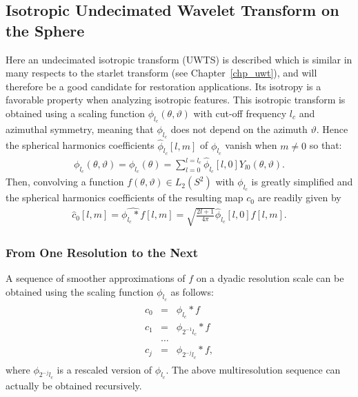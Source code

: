 \subsection{Isotropic Undecimated Wavelet Transform on the Sphere}
Here an undecimated isotropic transform (UWTS) is described which is similar in many respects to the starlet transform (see Chapter~\ref{chp_uwt}), and will therefore be a good candidate for restoration applications.
Its isotropy is a favorable property when analyzing isotropic features. 
This isotropic transform is obtained using a scaling function ${\phi}_{l_c}(\theta, \vartheta)$ 
with cut-off frequency  $l_c$ and  azimuthal symmetry, meaning that ${\phi}_{l_c}$ does not depend 
on the azimuth $\vartheta$. Hence the spherical harmonics coefficients $\hat {\phi}_{l_c} [l,m]$ of ${\phi}_{l_c}$ vanish 
when $m \ne 0$ so that:
\begin{eqnarray}
{\phi}_{l_c}(\theta, \vartheta)= {\phi}_{l_c}(\theta) = \sum_{l = 0}^{l = l_c} \hat  {\phi}_{l_c} [l,0] Y_{l0}(\theta, \vartheta) .
\end{eqnarray}
Then, convolving a function $f(\theta, \vartheta) \in L_2(S^2)$ with ${\phi}_{l_c}$ is greatly simplified 
and the spherical harmonics coefficients of the resulting map $c_0$ are readily given by
\begin{eqnarray}
 \hat c_{0}[l,m] = \widehat{{\phi}_{l_c} * f} [l,m] = \sqrt{\frac{2l+1}{4\pi} } \hat {\phi}_{l_c} [l,0] \hat f[l,m]  .
\end{eqnarray}

\subsubsection{From One Resolution to the Next}

A sequence of smoother approximations of $f$ on 
a dyadic resolution scale can be obtained using the scaling function ${\phi}_{l_c}$ as follows:
\begin{eqnarray}
\begin{split}
c_0   & = &  {\phi}_{ l_{c} }  \ast f        \\
c_1   & = &  {\phi}_{2^{-1} l_{c} }   \ast f    	   \\
&\ldots&\\ 
c_j    &=&   {\phi}_{2^{-j}  l_{c}  }  \ast f  ,
\end{split}
\end{eqnarray}
where ${\phi}_{2^{-j} l_{c} }$ is a rescaled version of ${\phi}_{l_{c}}$. The above multiresolution sequence can actually  be obtained recursively. 

